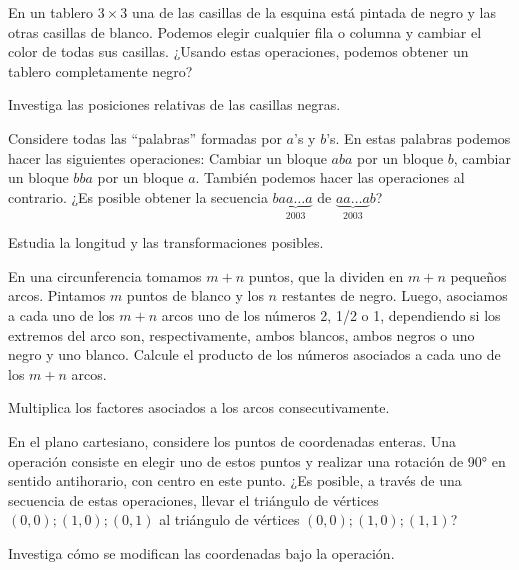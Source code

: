 \documentclass[11pt]{scrartcl}
\begin{document}
\begin{problem}
En un tablero \( 3 \times 3 \) una de las casillas de la esquina está pintada de negro y las otras casillas de blanco. Podemos elegir cualquier fila o columna y cambiar el color de todas sus casillas. ¿Usando estas operaciones, podemos obtener un tablero completamente negro?
\begin{hint}
Investiga las posiciones relativas de las casillas negras.
\end{hint}
\end{problem}

\begin{problem}[Bulgaria 2004] Considere todas las ``palabras'' formadas por \( a \)'s y \( b \)'s. En estas palabras podemos hacer las siguientes operaciones: Cambiar un bloque \( aba \) por un bloque \( b \), cambiar un bloque \( bba \) por un bloque \( a \). También podemos hacer las operaciones al contrario. ¿Es posible obtener la secuencia \( b \underbrace{aa\ldots a}_{2003} \) de \( \underbrace{aa\ldots a}_{2003}b \)?
\begin{hint}
Estudia la longitud y las transformaciones posibles.
\end{hint}
\end{problem}

\begin{problem}[Fortaleza 2003] En una circunferencia tomamos \( m + n \) puntos, que la dividen en \( m + n \) pequeños arcos. Pintamos \( m \) puntos de blanco y los \( n \) restantes de negro. Luego, asociamos a cada uno de los \( m + n \) arcos uno de los números 2, 1/2 o 1, dependiendo si los extremos del arco son, respectivamente, ambos blancos, ambos negros o uno negro y uno blanco. Calcule el producto de los números asociados a cada uno de los \( m + n \) arcos.
\begin{hint}
Multiplica los factores asociados a los arcos consecutivamente.
\end{hint}
\end{problem}

\begin{problem} En el plano cartesiano, considere los puntos de coordenadas enteras. Una operación consiste en elegir uno de estos puntos y realizar una rotación de 90° en sentido antihorario, con centro en este punto. ¿Es posible, a través de una secuencia de estas operaciones, llevar el triángulo de vértices \( (0,0); (1,0); (0,1) \) al triángulo de vértices \( (0,0); (1,0); (1,1) \)?
\begin{hint}
Investiga cómo se modifican las coordenadas bajo la operación.
\end{hint}
\end{problem}
\end{document}
